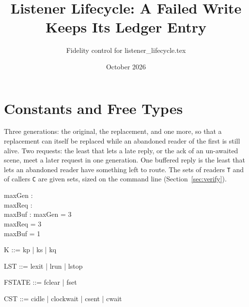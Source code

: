 \documentclass[a4paper,10pt,fleqn]{article}
\begin{document}
\title{Listener Lifecycle: A Failed Write Keeps Its Ledger Entry}
\author{Fidelity control for listener\_lifecycle.tex}
\date{October 2026}
\maketitle

\section{Constants and Free Types}

Three generations: the original, the replacement, and one more, so that a
replacement can itself be replaced while an abandoned reader of the first is
still alive.  Two requests: the least that lets a late reply, or the ack of an
un-awaited scene, meet a later request in one generation.  One buffered reply
is the least that lets an abandoned reader have something left to route.  The
sets of readers \texttt{T} and of callers \texttt{C} are given sets, sized on
the command line (Section~\ref{sec:verify}).

\begin{axdef}
  maxGen : \nat \\
  maxReq : \nat \\
  maxBuf : \nat
\where
  maxGen = 3 \\
  maxReq = 3 \\
  maxBuf = 1
\end{axdef}

\begin{zed}
  [T]
\end{zed}

\begin{zed}
  [C]
\end{zed}

\begin{zed}
  K ::= kp | ks | kq
\end{zed}

\begin{zed}
  LST ::= lexit | lrun | lstop
\end{zed}

\begin{zed}
  FSTATE ::= fclear | fset
\end{zed}

\begin{zed}
  CST ::= cidle | clockwait | csent | cwait
\end{zed}
\end{document}
